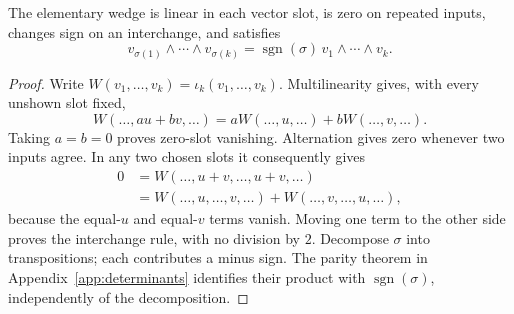 \begin{center}
\end{center}

\begin{proposition}
The elementary wedge is linear in each vector slot, is zero on repeated
inputs, changes sign on an interchange, and satisfies
\[
v_{\sigma(1)}\wedge\cdots\wedge v_{\sigma(k)}
=\operatorname{sgn}(\sigma)\,v_1\wedge\cdots\wedge v_k.
\]
\end{proposition}
\begin{proof}
Write $W(v_1,\ldots,v_k)=\iota_k(v_1,\ldots,v_k)$. Multilinearity gives,
with every unshown slot fixed,
\[
W(\ldots,au+bv,\ldots)=aW(\ldots,u,\ldots)+bW(\ldots,v,\ldots).
\]
Taking $a=b=0$ proves zero-slot vanishing. Alternation gives zero whenever
two inputs agree. In any two chosen slots it consequently gives
\[
\begin{aligned}
0&=W(\ldots,u+v,\ldots,u+v,\ldots)\\
 &=W(\ldots,u,\ldots,v,\ldots)+W(\ldots,v,\ldots,u,\ldots),
\end{aligned}
\]
because the equal-$u$ and equal-$v$ terms vanish. Moving one term to the
other side proves the interchange rule, with no division by $2$.
Decompose $\sigma$ into transpositions; each contributes a minus sign.
The parity theorem in Appendix~\ref{app:determinants} identifies their
product with $\operatorname{sgn}(\sigma)$, independently of the decomposition.
\end{proof}

